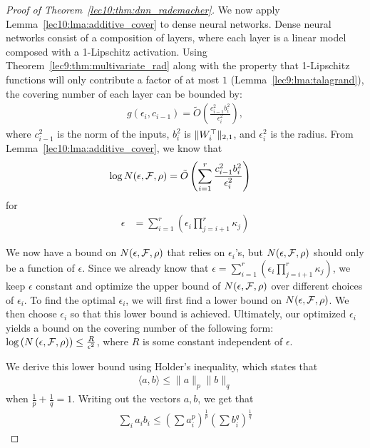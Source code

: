 \begin{proof}[Proof of Theorem~\ref{lec10:thm:dnn_rademacher}]
	We now apply Lemma~\ref{lec10:lma:additive_cover} to dense neural networks. Dense neural networks consist of a composition of layers, where each layer is a linear model composed with a 1-Lipschitz activation. Using Theorem~\ref{lec9:thm:multivariate_rad} along with the property that 1-Lipschitz functions will only contribute a factor of at most $1$ (Lemma~\ref{lec9:lma:talagrand}), the covering number of each layer can be bounded by:
	\begin{align}
	g\left(\epsilon_i, c_{i-1}\right) = \tilde{O}\left(\frac{c_{i-1}^2b_i^2}{\epsilon_i^2}\right),
	\end{align}
	where $c_{i-1}^2$ is the norm of the inputs, $b_i^2$ is $\|W_i^\top\|_{2,1}$, and $\epsilon_i^2$ is the radius. From Lemma~\ref{lec10:lma:additive_cover}, we know that 
	\begin{align}
	\log N(\epsilon, \mathcal F, \rho) &= \tilde{O}\left(\sum_{i=1}^{r}\frac{c_{i-1}^2b_i^2}{\epsilon_i^2}\right) 
	\end{align}
	for
	\begin{align}
	\epsilon &= \sum_{i=1}^{r} \left(\epsilon_i \prod_{j=i+1}^{r}\kappa_j\right)
	\end{align}
	
	We now have a bound on $N(\epsilon, \mathcal F, \rho)$ that relies on $\epsilon_i$'s, but $N(\epsilon, \mathcal F, \rho)$ should only be a function of $\epsilon$. Since we already know that $\epsilon = \sum_{i=1}^{r} \left(\epsilon_i \prod_{j=i+1}^{r}\kappa_j\right)$, we keep $\epsilon$ constant and optimize the upper bound of $N(\epsilon, \mathcal F, \rho)$ over different choices of $\epsilon_i$. To find the optimal $\epsilon_i$, we will first find a lower bound on $N(\epsilon, \mathcal F, \rho)$. We then choose $\epsilon_i$ so that this lower bound is achieved. Ultimately, our optimized $\epsilon_i$ yields a bound on the covering number of the following form: $\log\left(N\left(\epsilon, \mathcal F, \rho\right)\right) \leq \frac{R}{\epsilon^2}$, where $R$ is some constant independent of $\epsilon$. 
	
	We derive this lower bound using Holder's inequality, which states that
	\begin{align}
	\langle a,  b \rangle \leq \|a\|_p \|b\|_q
	\end{align}
	when $\frac{1}{p} + \frac{1}{q} = 1$. Writing out the vectors $a, b$, we get that 
	\begin{align}
	\sum_{i}a_ib_i \leq \left(\sum a_i^p\right)^{\frac{1}{p}}\left(\sum b_i^q\right)^{\frac{1}{q}}
	\end{align}
	

\end{proof}

